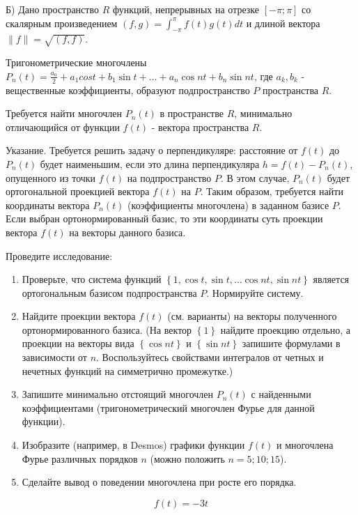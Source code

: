 Б) Дано пространство $R$ функций, непрерывных на отрезке $[-\pi; \pi]$ со скалярным произведением $(f, g) = \int^\pi_{-\pi} f(t)g(t)dt$ и длиной вектора $\|f\| = \sqrt{(f, f)}$.

Тригонометрические многочлены $P_n(t) = \frac{a_0}{2} + a_1 cost + b_1 \sin t + \dots + a_n \cos nt + b_n \sin nt$, где $a_k, b_k$ - вещественные коэффициенты,
образуют подпространство $P$ пространства $R$.

Требуется найти многочлен $P_n(t)$ в пространстве $R$, минимально отличающийся от функции $f(t)$ - вектора пространства $R$.

Указание.
Требуется решить задачу о перпендикуляре: расстояние от $f\left(t\right)$ до $P_n\left(t\right)$ будет наименьшим,
если это длина перпендикуляра $h=f\left(t\right)-P_n\left(t\right)$, опущенного из точки $f\left(t\right)$ на подпространство $P$.
В этом случае, $P_n\left(t\right)$ будет ортогональной проекцией вектора $f\left(t\right)$ на $P$.
Таким образом, требуется найти координаты вектора $P_n\left(t\right)$ (коэффициенты многочлена) в заданном базисе $P$.
Если выбран ортонормированный базис, то эти координаты суть проекции вектора $f\left(t\right)$ на векторы данного базиса.

Проведите исследование:
\begin{enumerate}
    \item Проверьте, что система функций $\left\{1,\cos{t},\sin{t},\ldots\cos{n}t,\sin{n}t\right\}$ является ортогональным базисом подпространства $P$. Нормируйте систему.
    \item Найдите проекции вектора $f\left(t\right)$ (см. варианты) на векторы полученного ортонормированного базиса.
    (На вектор $\left\{1\right\}$ найдите проекцию отдельно, а проекции на векторы вида $\left\{\cos{n}t\right\}$ и $\left\{\sin{n}t\right\}$ запишите формулами в зависимости от $n$. Воспользуйтесь свойствами интегралов от четных и нечетных функций на симметрично промежутке.)
    \item Запишите минимально отстоящий многочлен $P_n\left(t\right)$ с найденными коэффициентами (тригонометрический многочлен Фурье для данной функции).
    \item Изобразите (например, в Desmos) графики функции $f\left(t\right)$ и многочлена Фурье различных порядков $n$ (можно положить $n=5;10;15$).
    \item Сделайте вывод о поведении многочлена при росте его порядка.
\end{enumerate}

\[f\left(t\right)=-3t\]

